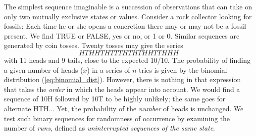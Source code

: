 	The simplest sequence imaginable is a succession of observations that can take on only two 
mutually exclusive states or values.  Consider a rock collector looking for fossils:  Each time he 
or she opens a concretion there may or may not be a fossil present.  We find TRUE or FALSE, 
yes or no, or 1 or 0.  Similar sequences are generated by coin tosses.  Twenty tosses may give the 
series
\begin{equation}
HTHHTHTTTHTHTHHTTHHH
\label{eq:heads}
\end{equation}
with 11 heads and 9 tails, close to the expected 10/10.  The probability of finding a given number 
of heads ($x$) in a series of $n$ tries is given by the binomial distribution (\ref{eq:binomial_dist}).
However, there is nothing in that expression that takes the \emph{order} in which the heads appear into account.  We would find 
a sequence of 10H followed by 10T to be highly unlikely; the same goes for alternate HTH...  Yet, the 
probability of the \emph{number} of heads is unchanged.  We test such binary sequences for randomness 
of occurrence by examining the number of \emph{runs}, defined as \emph{uninterrupted sequences of the same 
state}.

